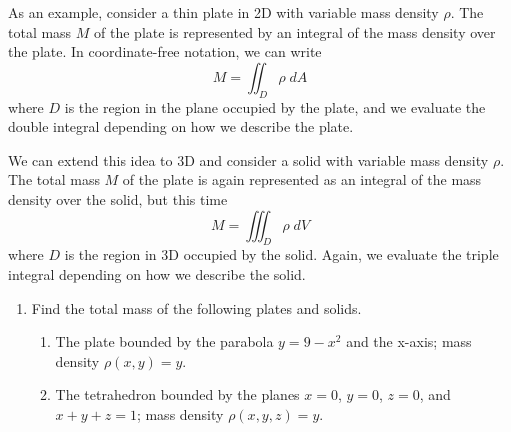 \documentclass{tufte-handout}
\begin{document}
As an example, consider a thin plate in 2D with variable mass density $\rho$. The total mass $M$ of the plate is represented by an integral of the mass density over the plate. In coordinate-free notation, we can write
\[M = \iint_D \rho \; dA \]
where $D$ is the region in the plane occupied by the plate, and we evaluate the double integral depending on how we describe the plate.

We can extend this idea to 3D and consider a solid with variable mass density $\rho$. The total mass $M$ of the plate is again represented as an integral of the mass density over the solid, but this time
\[M = \iiint_D \rho \; dV \]
where $D$ is the region in 3D occupied by the solid. Again, we evaluate the triple integral depending on how we describe the solid.

\begin{enumerate}[resume]
\item Find the total mass of the following plates and solids.
\begin{enumerate}
\item The plate bounded by the parabola $y = 9 - x^2$ and the x-axis; mass density $\rho(x,y) = y$.
\item The tetrahedron bounded by the planes $x=0$, $y=0$, $z=0$, and $x+y+z=1$; mass density $\rho(x,y,z) = y$.
\end{enumerate}
\end{enumerate}
\end{document}
